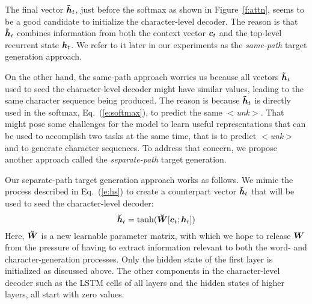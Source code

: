 \documentclass[11pt]{article}
\newcommand{\imgExt}{eps}
\newcommand{\MB}[1]{\mbox{\boldmath{$#1$}}} %
\newcommand{\eq}[1]{Eq.~(\ref{#1})}
\newcommand{\hi}{\MB{h}_{t}} %
\newcommand{\his}{\MB{\bar{h}}_{s}} %
\newcommand{\hs}{\MB{\tilde{h}}_{t}} %
\newcommand{\co}{\MB{c}_{t}} %
\newcommand{\W}[1]{\MB{W_{#1}}} %
\newcommand{\Ww}{\MB{W}} %
\newcommand{\Wc}{\MB{\breve{W}}} %
\newcommand{\hc}{\MB{\breve{h}}_{t}} %
\newcommand{\unk}{$<${\it unk}$>$}
\begin{document}
The final vector $\hs$, just before the
softmax as shown in Figure~\ref{f:attn}, seems to be a good candidate to initialize the character-level decoder.
The reason is that $\hs$ combines
information from both the context vector $\co$ and the top-level recurrent
state $\hi$. We refer to it later in our
experiments as the \textit{same-path} target generation approach.

On the other hand, the same-path approach worries us because all vectors $\hs$
used to seed the character-level decoder might have similar values, leading to
the same character sequence being produced.
The reason is because $\hs$ is directly used in the softmax, \eq{e:softmax}, to predict the same \unk{}.
That might pose some challenges for the model to learn useful representations
that can be used to accomplish two tasks at the same time, that is to predict
\unk{} and to generate character sequences.
To address that concern, we propose another approach called
the \textit{separate-path} target generation.

Our separate-path target generation approach works as follows. We mimic the
process described in \eq{e:hs} to create a counterpart vector $\hc$ that will be
used to seed the character-level decoder:
\begin{equation}
\hc = \tanh(\Wc[\co; \hi])
\label{e:hc}
\end{equation} 
Here, $\Wc$ is a new learnable parameter matrix, with which we
hope to release $\W{}$ from the pressure of having to extract information
relevant to both the word- and character-generation processes.
Only the hidden
state of the first layer is initialized as discussed above. The other components
in the character-level decoder such as the
LSTM cells of all layers and the hidden states of higher layers, all start with zero values.

\end{document}
